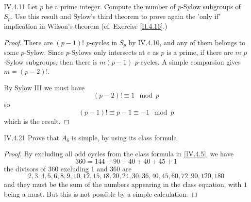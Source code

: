 \begin{problem}{IV.4.11}
Let $p$ be a prime integer. Compute the number of $p$-Sylow subgroups of $S_p$. Use this result and Sylow's third theorem to prove again the 'only if' implication in Wilson's theorem (cf. Exercise \ref{II.4.16}.)
\end{problem}
\begin{proof}
There are $(p-1)!$ $p$-cycles in $S_p$ by IV.4.10, and any of them belongs to some $p$-Sylow. Since $p$-Sylows only intersects at $e$ as $p$ is a prime, if there are $m$ $p$-Sylow subgroups, then there is $m(p-1)$ $p$-cycles. A simple comparsion gives $m = (p-2)!$.

By Sylow III we must have
\[
(p-2)! \equiv 1 \mod p	
\]
so
\[
(p-1)! \equiv p-1 \equiv -1 \mod p
\]
which is the result.
\end{proof}

\begin{problem}{IV.4.21}
Prove that $A_6$ is simple, by using its class formula.
\end{problem}
\begin{proof}
By excluding all odd cycles from the class formula in \ref{IV.4.5}, we have
\[
360 = 144 + 90 + 40 + 40 + 45 + 1
\]
the divisors of 360 excluding 1 and 360 are
\[
2, 3, 4, 5, 6, 8, 9, 10, 12, 15, 18, 20, 24 ,30, 36 ,40, 45, 60, 72, 90, 120, 180
\]
and they must be the sum of the numbers appearing in the class equation, with $1$ being a must. But this is not possible by a simple calculation. 
\end{proof}

\section{}

